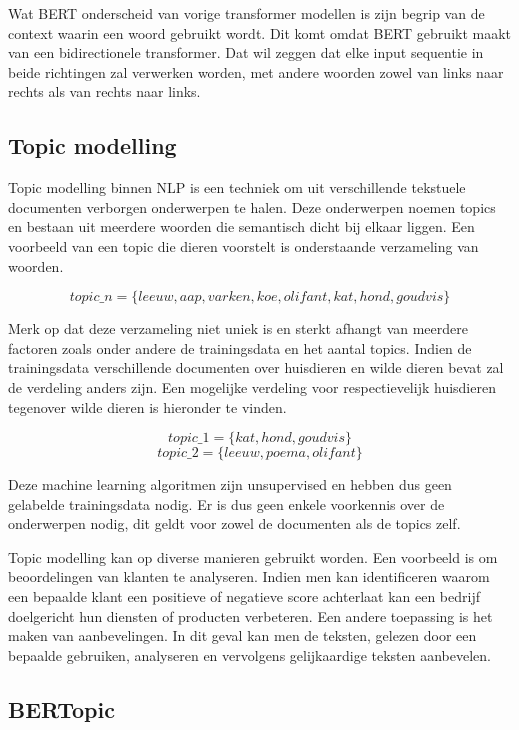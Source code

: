 Wat BERT onderscheid van vorige transformer modellen is zijn begrip van de context waarin een woord gebruikt wordt. Dit komt omdat BERT gebruikt maakt van een bidirectionele transformer.  Dat wil zeggen dat elke input sequentie in beide richtingen zal verwerken worden, met andere woorden zowel van links naar rechts als van rechts naar links.


\subsection{Topic modelling}

Topic modelling binnen NLP is een techniek om uit verschillende tekstuele documenten verborgen onderwerpen te halen. Deze onderwerpen noemen topics en bestaan uit meerdere woorden die semantisch dicht bij elkaar liggen. Een voorbeeld van een topic die dieren voorstelt is onderstaande verzameling van woorden.

\[
topic\_n = \{leeuw, aap, varken, koe, olifant, kat, hond, goudvis\}
\]

Merk op dat deze verzameling niet uniek is en sterkt afhangt van meerdere factoren zoals onder andere de trainingsdata en het aantal topics. Indien de trainingsdata verschillende documenten over huisdieren en wilde dieren bevat zal de verdeling anders zijn. Een mogelijke verdeling voor respectievelijk huisdieren tegenover wilde dieren is hieronder te vinden.

\[
topic\_1 = \{kat, hond, goudvis\}
\]
\[
topic\_2 =\{leeuw, poema, olifant\}
\]

Deze machine learning algoritmen zijn unsupervised en hebben dus geen gelabelde trainingsdata nodig. Er is dus geen enkele voorkennis over de onderwerpen nodig, dit geldt voor zowel de documenten als de topics zelf. 

Topic modelling kan op diverse manieren gebruikt worden. Een voorbeeld is om beoordelingen van klanten te analyseren. Indien men kan identificeren waarom een bepaalde klant een positieve of negatieve score achterlaat kan een bedrijf doelgericht hun diensten of producten verbeteren. Een andere toepassing is het maken van aanbevelingen. In dit geval kan men de teksten, gelezen door een bepaalde gebruiken, analyseren en vervolgens gelijkaardige teksten aanbevelen.

\subsection{BERTopic}

